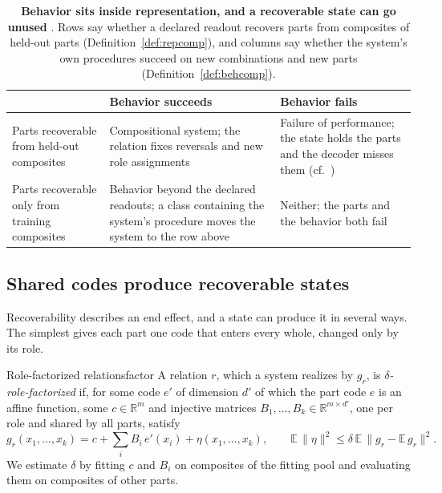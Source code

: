\documentclass[10pt]{article}
\theoremstyle{plain}
\theoremstyle{remark}
\newcommand{\R}{\mathbb{R}}
\begin{document}
\begin{table}[t]
  \caption{\textbf{Behavior sits inside representation, and a recoverable state can go unused} \citep[cf.][]{vegner2025}. Rows say whether a declared readout recovers parts from composites of held-out parts (Definition~\ref{def:repcomp}), and columns say whether the system's own procedures succeed on new combinations and new parts (Definition~\ref{def:behcomp}).}
  \label{tab:twobytwo}
  \centering\small
  \begin{tabularx}{\linewidth}{@{}P{3.2cm}YY@{}}
    \toprule
    & Behavior succeeds & Behavior fails \\
    \midrule
    Parts recoverable from held-out composites & Compositional system; the relation fixes reversals and new role assignments & Failure of performance; the state holds the parts and the decoder misses them (cf.\ \citealt{montero2021}) \\
    Parts recoverable only from training composites & Behavior beyond the declared readouts; a class containing the system's procedure moves the system to the row above & Neither; the parts and the behavior both fail \\
    \bottomrule
  \end{tabularx}
\end{table}

\subsection{Shared codes produce recoverable states}
\label{sec:mechanics}

Recoverability describes an end effect, and a state can produce it in several ways. The simplest gives each part one code that enters every whole, changed only by its role.

\begin{defbox}{Role-factorized relations}{factor}
A relation $r$, which a system realizes by $g_r$, is \emph{$\delta$-role-factorized} if, for some code $e'$ of dimension $d'$ of which the part code $e$ is an affine function, some $c \in \R^m$ and injective matrices $B_1, \ldots, B_k \in \R^{m \times d'}$, one per role and shared by all parts, satisfy
\begin{equation}
  g_r(x_1, \ldots, x_k) = c + \textstyle\sum_{i} B_i\, e'(x_i) + \eta(x_1, \ldots, x_k), \qquad \mathbb{E}\,\lVert \eta \rVert^2 \le \delta\, \mathbb{E}\,\lVert g_r - \mathbb{E}\,g_r \rVert^2 .
  \label{eq:factor}
\end{equation}
We estimate $\delta$ by fitting $c$ and $B_i$ on composites of the fitting pool and evaluating them on composites of other parts.
\end{defbox}
\end{document}
